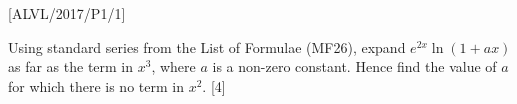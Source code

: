 \item {[}ALVL/2017/P1/1{]}

Using standard series from the List of Formulae (MF26), expand $e^{2x}\ln\left(1+ax\right)$
as far as the term in $x^{3}$, where $a$ is a non-zero constant.
Hence find the value of $a$ for which there is no term in $x^{2}$.
\hfill{}{[}4{]}
